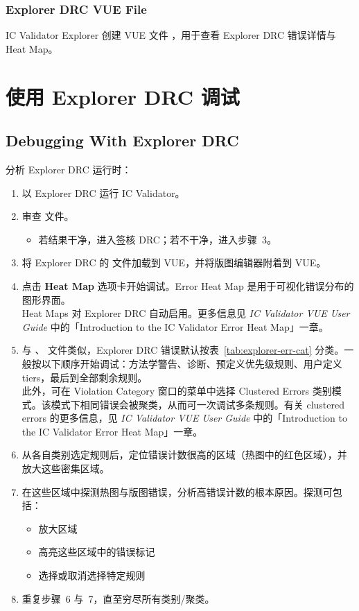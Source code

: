 \subsubsection*{Explorer DRC VUE File}

IC Validator Explorer 创建 VUE 文件 ，用于查看 Explorer DRC 错误详情与 Heat Map。

\section{使用 Explorer DRC 调试}
\subsection*{Debugging With Explorer DRC}

分析 Explorer DRC 运行时：
\begin{enumerate}
  \item 以 Explorer DRC 运行 IC Validator。
  \item 审查  文件。
  \begin{itemize}
    \item 若结果干净，进入签核 DRC；若不干净，进入步骤~3。
  \end{itemize}
  \item 将 Explorer DRC 的  文件加载到 VUE，并将版图编辑器附着到 VUE。
  \item 点击 \textbf{Heat Map} 选项卡开始调试。Error Heat Map 是用于可视化错误分布的图形界面。\\
  Heat Maps 对 Explorer DRC 自动启用。更多信息见 \textit{IC Validator VUE User Guide} 中的「Introduction to the IC Validator Error Heat Map」一章。
  \item 与 、 文件类似，Explorer DRC 错误默认按表~\ref{tab:explorer-err-cat} 分类。一般按以下顺序开始调试：方法学警告、诊断、预定义优先级规则、用户定义 tiers，最后到全部剩余规则。\\
  此外，可在 Violation Category 窗口的菜单中选择 Clustered Errors 类别模式。该模式下相同错误会被聚类，从而可一次调试多条规则。有关 clustered errors 的更多信息，见 \textit{IC Validator VUE User Guide} 中的「Introduction to the IC Validator Error Heat Map」一章。
  \item 从各自类别选定规则后，定位错误计数很高的区域（热图中的红色区域），并放大这些密集区域。
  \item 在这些区域中探测热图与版图错误，分析高错误计数的根本原因。探测可包括：
  \begin{itemize}
    \item 放大区域
    \item 高亮这些区域中的错误标记
    \item 选择或取消选择特定规则
  \end{itemize}
  \item 重复步骤~6 与~7，直至穷尽所有类别/聚类。
\end{enumerate}

